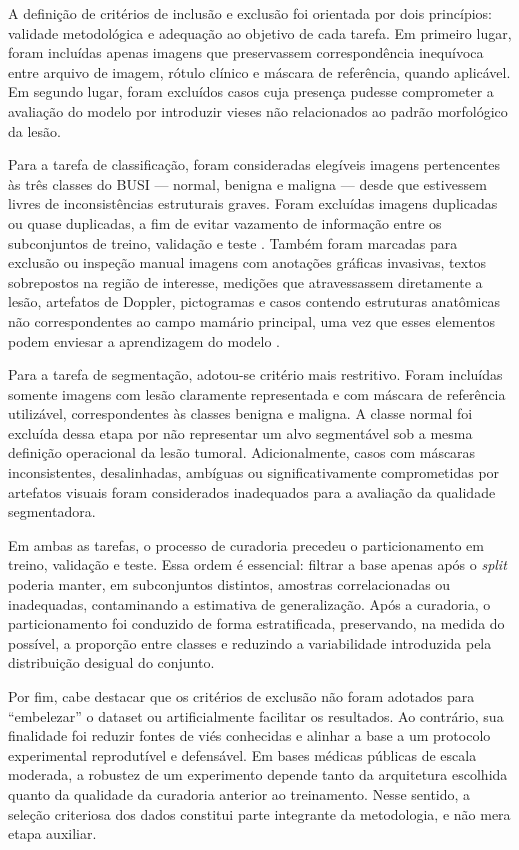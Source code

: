 \documentclass[tcc,capa]{texufpel}
\begin{document}
A definição de critérios de inclusão e exclusão foi orientada por dois princípios: validade metodológica e adequação ao objetivo de cada tarefa. Em primeiro lugar, foram incluídas apenas imagens que preservassem correspondência inequívoca entre arquivo de imagem, rótulo clínico e máscara de referência, quando aplicável. Em segundo lugar, foram excluídos casos cuja presença pudesse comprometer a avaliação do modelo por introduzir vieses não relacionados ao padrão morfológico da lesão.

Para a tarefa de classificação, foram consideradas elegíveis imagens pertencentes às três classes do BUSI --- normal, benigna e maligna --- desde que estivessem livres de inconsistências estruturais graves. Foram excluídas imagens duplicadas ou quase duplicadas, a fim de evitar vazamento de informação entre os subconjuntos de treino, validação e teste \cite{Pawlowska2023,AumenteMaestro2025}. Também foram marcadas para exclusão ou inspeção manual imagens com anotações gráficas invasivas, textos sobrepostos na região de interesse, medições que atravessassem diretamente a lesão, artefatos de Doppler, pictogramas e casos contendo estruturas anatômicas não correspondentes ao campo mamário principal, uma vez que esses elementos podem enviesar a aprendizagem do modelo \cite{Pawlowska2023}.

Para a tarefa de segmentação, adotou-se critério mais restritivo. Foram incluídas somente imagens com lesão claramente representada e com máscara de referência utilizável, correspondentes às classes benigna e maligna. A classe normal foi excluída dessa etapa por não representar um alvo segmentável sob a mesma definição operacional da lesão tumoral. Adicionalmente, casos com máscaras inconsistentes, desalinhadas, ambíguas ou significativamente comprometidas por artefatos visuais foram considerados inadequados para a avaliação da qualidade segmentadora.

Em ambas as tarefas, o processo de curadoria precedeu o particionamento em treino, validação e teste. Essa ordem é essencial: filtrar a base apenas após o \textit{split} poderia manter, em subconjuntos distintos, amostras correlacionadas ou inadequadas, contaminando a estimativa de generalização. Após a curadoria, o particionamento foi conduzido de forma estratificada, preservando, na medida do possível, a proporção entre classes e reduzindo a variabilidade introduzida pela distribuição desigual do conjunto.

Por fim, cabe destacar que os critérios de exclusão não foram adotados para ``embelezar'' o dataset ou artificialmente facilitar os resultados. Ao contrário, sua finalidade foi reduzir fontes de viés conhecidas e alinhar a base a um protocolo experimental reprodutível e defensável. Em bases médicas públicas de escala moderada, a robustez de um experimento depende tanto da arquitetura escolhida quanto da qualidade da curadoria anterior ao treinamento. Nesse sentido, a seleção criteriosa dos dados constitui parte integrante da metodologia, e não mera etapa auxiliar.
\end{document}
